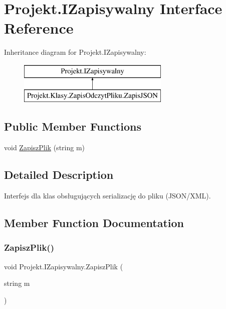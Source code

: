 \hypertarget{interface_projekt_1_1_i_zapisywalny}{}\section{Projekt.\+I\+Zapisywalny Interface Reference}
\label{interface_projekt_1_1_i_zapisywalny}


 


Inheritance diagram for Projekt.\+I\+Zapisywalny\+:\begin{figure}[H]
\begin{center}
\leavevmode
\includegraphics[height=2.000000cm]{interface_projekt_1_1_i_zapisywalny}
\end{center}
\end{figure}
\subsection*{Public Member Functions}
\begin{DoxyCompactItemize}
\item 
void \mbox{\hyperlink{interface_projekt_1_1_i_zapisywalny_ac6d252f9fcb7128cbd5482471f541baf}{Zapisz\+Plik}} (string m)
\end{DoxyCompactItemize}


\subsection{Detailed Description}


Interfejs dla klas obsługujących serializację do pliku (J\+S\+O\+N/\+X\+ML). 

\subsection{Member Function Documentation}
\mbox{\label{interface_projekt_1_1_i_zapisywalny_ac6d252f9fcb7128cbd5482471f541baf}} 
\subsubsection{\texorpdfstring{ZapiszPlik()}{ZapiszPlik()}}
{\footnotesize\ttfamily void Projekt.\+I\+Zapisywalny.\+Zapisz\+Plik (\begin{DoxyParamCaption}\item[{string}]{m }\end{DoxyParamCaption})}



